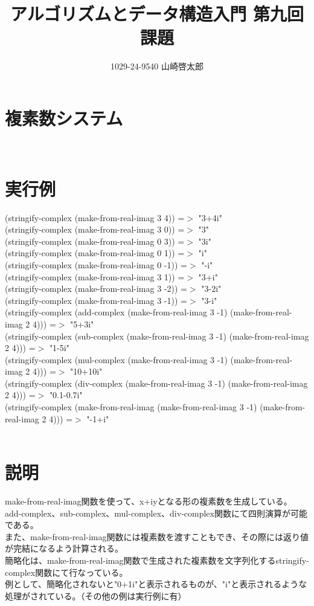 ﻿\documentclass[a4paper,12pt]{article}
\title{アルゴリズムとデータ構造入門 第九回課題}
\author{1029-24-9540 山崎啓太郎}
\begin{document}
\maketitle

\section{複素数システム}
\lstset{numbers=left,basicstyle=\small}

\\
\section{実行例}
(stringify-complex (make-from-real-imag 3 4)) =$>$ "3+4i"\\
(stringify-complex (make-from-real-imag 3 0)) =$>$ "3"\\
(stringify-complex (make-from-real-imag 0 3)) =$>$ "3i"\\
(stringify-complex (make-from-real-imag 0 1)) =$>$ "i"\\
(stringify-complex (make-from-real-imag 0 -1)) =$>$ "-i"\\
(stringify-complex (make-from-real-imag 3 1)) =$>$ "3+i"\\
(stringify-complex (make-from-real-imag 3 -2)) =$>$ "3-2i"\\
(stringify-complex (make-from-real-imag 3 -1)) =$>$ "3-i"\\
(stringify-complex (add-complex (make-from-real-imag 3 -1) (make-from-real-imag 2 4))) =$>$ "5+3i"\\
(stringify-complex (sub-complex (make-from-real-imag 3 -1) (make-from-real-imag 2 4))) =$>$ "1-5i"\\
(stringify-complex (mul-complex (make-from-real-imag 3 -1) (make-from-real-imag 2 4))) =$>$ "10+10i"\\
(stringify-complex (div-complex (make-from-real-imag 3 -1) (make-from-real-imag 2 4))) =$>$ "0.1-0.7i"\\
(stringify-complex (make-from-real-imag (make-from-real-imag 3 -1) (make-from-real-imag 2 4))) =$>$ "-1+i"\\
\\
\section{説明}
make-from-real-imag関数を使って、x+iyとなる形の複素数を生成している。\\
add-complex、sub-complex、mul-complex、div-complex関数にて四則演算が可能である。\\
また、make-from-real-imag関数には複素数を渡すこともでき、その際には返り値が完結になるよう計算される。\\
簡略化は、make-from-real-imag関数で生成された複素数を文字列化するstringify-complex関数にて行なっている。\\
例として、簡略化されないと"0+1i"と表示されるものが、"i"と表示されるような処理がされている。（その他の例は実行例に有）\\
\end{document}

